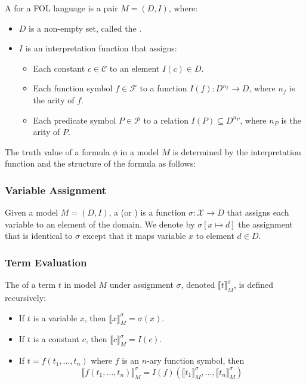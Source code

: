 A  for a FOL language is a pair \(M = (D, I)\), where:
\begin{itemize}
  \item \(D\) is a non-empty set, called the .
  \item \(I\) is an interpretation function that assigns:
  \begin{itemize}
    \item Each constant \(c \in \mathcal{C}\) to an element \(I(c) \in D\).
    \item Each function symbol \(f \in \mathcal{F}\) to a function \(I(f): D^{n_f} \to D\), where \(n_f\) is the arity of \(f\).
    \item Each predicate symbol \(P \in \mathcal{P}\) to a relation \(I(P) \subseteq D^{n_P}\), where \(n_P\) is the arity of \(P\).
  \end{itemize}
\end{itemize}
The truth value of a formula \(\phi\) in a model \(M\) is determined by the interpretation function and the structure of the formula as follows:

\subsubsection{Variable Assignment}\label{subsubsec:variable_assignment}
Given a model \(M = (D, I)\), a  (or ) is a function \(\sigma: \mathcal{X} \to D\) that assigns each variable to an element of the domain. We denote by \(\sigma[x \mapsto d]\) the assignment that is identical to \(\sigma\) except that it maps variable \(x\) to element \(d \in D\).

\subsubsection{Term Evaluation}\label{subsubsec:term_evaluation}
The  of a term \(t\) in model \(M\) under assignment \(\sigma\), denoted \(\llbracket t \rrbracket_M^\sigma\), is defined recursively:
\begin{itemize}
  \item If \(t\) is a variable \(x\), then \(\llbracket x \rrbracket_M^\sigma = \sigma(x)\).
  \item If \(t\) is a constant \(c\), then \(\llbracket c \rrbracket_M^\sigma = I(c)\).
  \item If \(t = f(t_1, \ldots, t_n)\) where \(f\) is an \(n\)-ary function symbol, then 
        \[\llbracket f(t_1, \ldots, t_n) \rrbracket_M^\sigma = I(f)(\llbracket t_1 \rrbracket_M^\sigma, \ldots, \llbracket t_n \rrbracket_M^\sigma)\]
\end{itemize}

